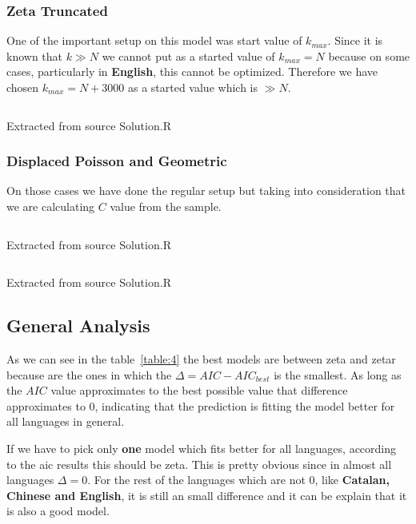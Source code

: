 \documentclass[12pt, a4paper]{article}
\begin{document}
\subsubsection{Zeta Truncated}
One of the important setup on this model was start value of $k_{max}$. Since it is known that $k \gg N$ we cannot put as a started value of $k_{max} = N$
because on some cases, particularly in \textbf{English}, this cannot be optimized. Therefore we have chosen $k_{max} = N + 3000$ as a started value which is $\gg N$. 
\begin{listing}[H]
    \inputminted[firstline=70, lastline=83, breaklines]{R}{./Solution.R}
    \caption{Extracted from source Solution.R}
    \label{apx:src:3}
\end{listing}  

\subsubsection{Displaced Poisson and Geometric}
On those cases we have done the regular setup but taking into consideration that we are calculating $C$ value from the sample.
\begin{listing}[H]
    \inputminted[firstline=11, lastline=19, breaklines]{R}{./Solution.R}
    \caption{Extracted from source Solution.R}
    \label{apx:src:4}
\end{listing}  
\begin{listing}[H]
    \inputminted[firstline=86, lastline=95, breaklines]{R}{./Solution.R}
    \caption{Extracted from source Solution.R}
    \label{apx:src:5}
\end{listing}  


\subsection{General Analysis}
As we can see in the table~\ref{table:4} the best models are between \acrshort{zeta} and \acrshort{zetar} because 
are the ones in which the $\Delta = AIC - AIC_{best}$ is the smallest. As long as the $AIC$ value approximates to the
best possible value that difference approximates to $0$, indicating that the prediction is fitting the model better for all languages
in general.

If we have to pick only \textbf{one} model which fits better for all languages, according to the \acrshort{aic} results this should be \acrshort{zeta}. This is 
pretty obvious since in almost all languages $\Delta = 0$. For the rest of the languages which are not $0$, like \textbf{Catalan, Chinese and English}, it is 
still an small difference and it can be explain that it is also a good model.
\end{document}
